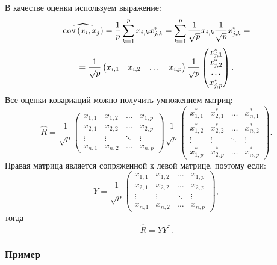В качестве оценки используем выражение:
\begin{multline*}
    \widehat{\mathtt{cov} \left ( x_i, x_j \right )}
    = \frac{1}{p} \sum_{k=1}^p x_{i,k} x_{j,k}^*
    = \sum_{k=1}^p \frac{1}{\sqrt{p}} x_{i,k} \frac{1}{\sqrt{p}} x_{j,k}^* = \\
    = \frac{1}{\sqrt{p}}
    \begin{pmatrix}
        x_{i,1} & x_{i,2} & \dots & x_{i,p}
    \end{pmatrix}
    \frac{1}{\sqrt{p}}
    \begin{pmatrix}
        x_{j,1}^* \\
        x_{j,2}^* \\
        \dots     \\
        x_{j,p}^*
    \end{pmatrix} .
\end{multline*}
Все оценки ковариаций можно получить умножением матриц:
\[
    \widehat{R} =
    \frac{1}{\sqrt{p}}
    \begin{pmatrix}
        x_{1,1} & x_{1,2} & \dots  & x_{1,p} \\
        x_{2,1} & x_{2,2} & \dots  & x_{2,p} \\
        \vdots  & \vdots  & \ddots & \vdots  \\
        x_{n,1} & x_{n,2} & \dots  & x_{n,p}
    \end{pmatrix}
    \frac{1}{\sqrt{p}}
    \begin{pmatrix}
        x_{1,1}^* & x_{2,1}^* & \dots  & x_{n,1}^* \\
        x_{1,2}^* & x_{2,2}^* & \dots  & x_{n,2}^* \\
        \vdots    & \vdots    & \ddots & \vdots    \\
        x_{1,p}^* & x_{2,p}^* & \dots  & x_{n,p}^*
    \end{pmatrix}
    .
\]
Правая матрица является сопряженной к левой матрице, поэтому если:
\[
    Y =
    \frac{1}{\sqrt{p}}
    \begin{pmatrix}
        x_{1,1} & x_{1,2} & \dots  & x_{1,p} \\
        x_{2,1} & x_{2,2} & \dots  & x_{2,p} \\
        \vdots  & \vdots  & \ddots & \vdots  \\
        x_{n,1} & x_{n,2} & \dots  & x_{n,p}
    \end{pmatrix} ,
\]
тогда
\[
    \widehat{R} = Y Y^* .
\]

\subsubsection{Пример}

